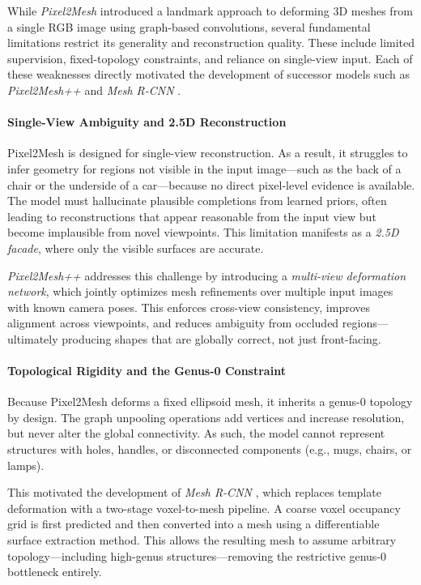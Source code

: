 While \emph{Pixel2Mesh} introduced a landmark approach to deforming 3D meshes from a single RGB image using graph-based convolutions, several fundamental limitations restrict its generality and reconstruction quality. These include limited supervision, fixed-topology constraints, and reliance on single-view input. Each of these weaknesses directly motivated the development of successor models such as \emph{Pixel2Mesh++} \cite{wen2019_pixel2meshplusplus} and \emph{Mesh R-CNN} \cite{gkioxari2020_meshrcnn}.

\paragraph{Single-View Ambiguity and 2.5D Reconstruction}

Pixel2Mesh is designed for single-view reconstruction. As a result, it struggles to infer geometry for regions not visible in the input image—such as the back of a chair or the underside of a car—because no direct pixel-level evidence is available. The model must hallucinate plausible completions from learned priors, often leading to reconstructions that appear reasonable from the input view but become implausible from novel viewpoints. This limitation manifests as a \emph{2.5D facade}, where only the visible surfaces are accurate.

\emph{Pixel2Mesh++} \cite{wen2019_pixel2meshplusplus} addresses this challenge by introducing a \emph{multi-view deformation network}, which jointly optimizes mesh refinements over multiple input images with known camera poses. This enforces cross-view consistency, improves alignment across viewpoints, and reduces ambiguity from occluded regions—ultimately producing shapes that are globally correct, not just front-facing.

\paragraph{Topological Rigidity and the Genus-0 Constraint}

Because Pixel2Mesh deforms a fixed ellipsoid mesh, it inherits a genus-0 topology by design. The graph unpooling operations add vertices and increase resolution, but never alter the global connectivity. As such, the model cannot represent structures with holes, handles, or disconnected components (e.g., mugs, chairs, or lamps).

This motivated the development of \emph{Mesh R-CNN} \cite{gkioxari2020_meshrcnn}, which replaces template deformation with a two-stage voxel-to-mesh pipeline. A coarse voxel occupancy grid is first predicted and then converted into a mesh using a differentiable surface extraction method. This allows the resulting mesh to assume arbitrary topology—including high-genus structures—removing the restrictive genus-0 bottleneck entirely.

